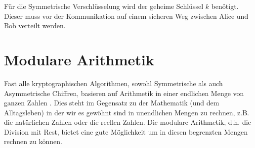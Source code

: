 \noindent
Für die Symmetrische Verschlüsselung wird der geheime Schlüssel $k$ benötigt. Dieser
muss vor der Kommunikation auf einem sicheren Weg zwischen Alice und Bob verteilt werden.

\section{Modulare Arithmetik}
Fast alle kryptographischen Algorithmen, sowohl Symmetrische als auch Asymmetrische Chiffren,
basieren auf Arithmetik in einer endlichen Menge von ganzen Zahlen \parencite[13]{BOOK:crypto}.
Dies steht im Gegensatz zu der Mathematik (und dem Alltagsleben)
in der wir es gewöhnt sind in unendlichen
Mengen zu rechnen, z.B. die natürlichen Zahlen oder die reellen Zahlen. Die modulare Arithmetik,
d.h. die Division mit Rest, bietet eine gute Möglichkeit um in diesen begrenzten Mengen rechnen
zu können.

